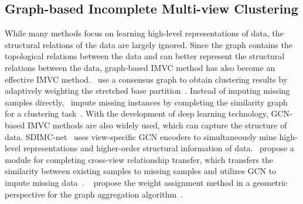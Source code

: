 \subsection{Graph-based Incomplete Multi-view Clustering}
While many methods focus on learning high-level representations of data, the structural relations of the data are largely ignored. Since the graph contains the topological relations between the data and can better represent the structural relations between the data, graph-based IMVC method has also become an effective IMVC method.~\citeauthor{li2021incomplete} use a consensus graph to obtain clustering results by adaptively weighting the stretched base partition~\cite{li2021incomplete}. Instead of imputing missing samples directly,~\citeauthor{liu2023self} impute missing instances by completing the similarity graph for a clustering task~\cite{liu2023self}. With the development of deep learning technology, GCN-based IMVC methods are also widely used, which can capture the structure of data. SDIMC-net~\cite{wen2021structural} uses view-specific GCN encoders to simultaneously mine high-level representations and higher-order structural information of data.~\citeauthor{wang2022incomplete} propose a module for completing cross-view relationship transfer, which transfers the similarity between existing samples to missing samples and utilizes GCN to impute missing data~\cite{wang2022incomplete}. ~\citeauthor{yang2024geometric} propose the weight assignment method in a geometric perspective for the graph aggregation algorithm~\cite{yang2024geometric}.